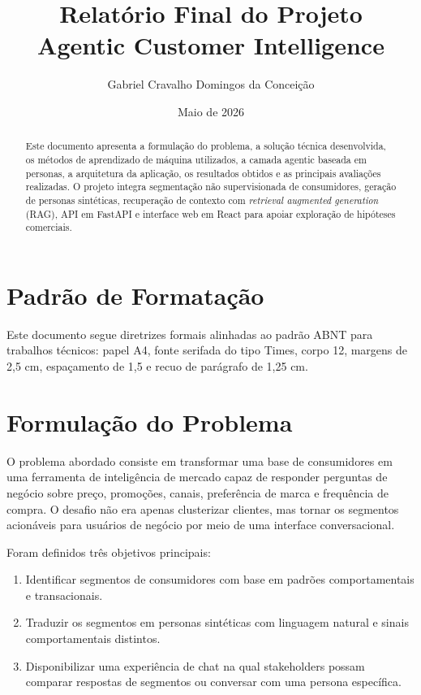\documentclass[12pt,a4paper]{article}
\title{\textbf{Relatório Final do Projeto}\\Agentic Customer Intelligence}
\author{Gabriel Cravalho Domingos da Conceição}
\date{Maio de 2026}
\begin{document}
\maketitle

\begin{abstract}
Este documento apresenta a formulação do problema, a solução técnica desenvolvida, os métodos de aprendizado de máquina utilizados, a camada agentic baseada em personas, a arquitetura da aplicação, os resultados obtidos e as principais avaliações realizadas. O projeto integra segmentação não supervisionada de consumidores, geração de personas sintéticas, recuperação de contexto com \textit{retrieval augmented generation} (RAG), API em FastAPI e interface web em React para apoiar exploração de hipóteses comerciais.
\end{abstract}

\section{Padrão de Formatação}

Este documento segue diretrizes formais alinhadas ao padrão ABNT para trabalhos técnicos: papel A4, fonte serifada do tipo Times, corpo 12, margens de 2,5 cm, espaçamento de 1,5 e recuo de parágrafo de 1,25 cm.

\section{Formulação do Problema}

O problema abordado consiste em transformar uma base de consumidores em uma ferramenta de inteligência de mercado capaz de responder perguntas de negócio sobre preço, promoções, canais, preferência de marca e frequência de compra. O desafio não era apenas clusterizar clientes, mas tornar os segmentos acionáveis para usuários de negócio por meio de uma interface conversacional.

Foram definidos três objetivos principais:

\begin{enumerate}
  \item Identificar segmentos de consumidores com base em padrões comportamentais e transacionais.
  \item Traduzir os segmentos em personas sintéticas com linguagem natural e sinais comportamentais distintos.
  \item Disponibilizar uma experiência de chat na qual stakeholders possam comparar respostas de segmentos ou conversar com uma persona específica.
\end{enumerate}
\end{document}
